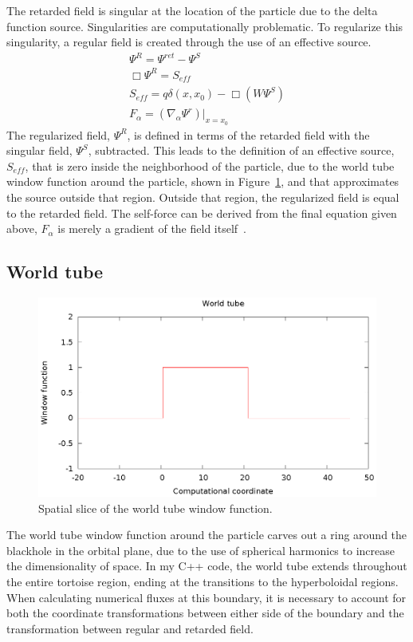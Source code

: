 The retarded field is singular at the location of the particle due to the delta function source. Singularities are computationally problematic. To regularize this singularity, a regular field is created through the use of an effective source.
\begin{eqnarray}
\Psi^R=\Psi^{ret}-\Psi^S\\
\Box\Psi^R=S_{eff}\\
S_{eff}=q\delta(x,x_0)-\Box(W\Psi^S)\\
F_\alpha=(\nabla_\alpha\Psi^r)|_{x=x_0}
\end{eqnarray}
The regularized field, $\Psi^R$, is defined in terms of the retarded field with the singular field, $\Psi^S$, subtracted. This leads to the definition of an effective source, $S_{eff}$, that is zero inside the neighborhood of the particle, due to the world tube window function around the particle, shown in Figure~\ref{wtwindow}, and that approximates the source outside that region. Outside that region, the regularized field is equal to the retarded field. The self-force can be derived from the final equation given above, $F_\alpha$ is merely a gradient of the field itself~\cite{vega_wardell_diener_eff_source}. 


\subsection{World tube}
\begin{figure}
\includegraphics{worldTubeItself}
\caption{Spatial slice of the world tube window function.}
\label{wtwindow}
\end{figure}

The world tube window function around the particle carves out a ring around the blackhole in the orbital plane, due to the use of spherical harmonics to increase the dimensionality of space. In my C++ code, the world tube extends throughout the entire tortoise region, ending at the transitions to the hyperboloidal regions. When calculating numerical fluxes at this boundary, it is necessary to account for both the coordinate transformations between either side of the boundary and the transformation between regular and retarded field.

